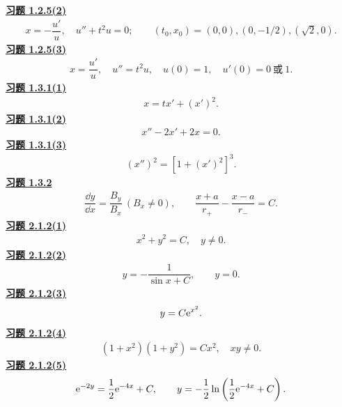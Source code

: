 \noindent\textbf{\hyperref[q:1.2.5(2)]{习题 1.2.5(2)}}
\[\begin{gathered}x=-\dfrac{u'}u,\quad u''+t^2u=0;\qquad
(t_0,x_0)=(0,0),(0,-1/2),(\sqrt2,0).\end{gathered}\]
\noindent\textbf{\hyperref[q:1.2.5(3)]{习题 1.2.5(3)}}
\[\begin{gathered}x=\dfrac{u'}u,\quad u''=t^2u,\quad u(0)=1,\quad
u'(0)=0\ \text{或}\ 1.\end{gathered}\]
\noindent\textbf{\hyperref[q:1.3.1(1)]{习题 1.3.1(1)}}
\[\begin{gathered}x=tx'+(x')^2.\end{gathered}\]
\noindent\textbf{\hyperref[q:1.3.1(2)]{习题 1.3.1(2)}}
\[\begin{gathered}x''-2x'+2x=0.\end{gathered}\]
\noindent\textbf{\hyperref[q:1.3.1(3)]{习题 1.3.1(3)}}
\[\begin{gathered}(x'')^2=[1+(x')^2]^3.\end{gathered}\]
\noindent\textbf{\hyperref[q:1.3.2]{习题 1.3.2}}
\[\begin{gathered}\dfrac{\dd y}{\dd x}=\dfrac{B_y}{B_x}\ (B_x\ne0),\qquad
\dfrac{x+a}{r_+}-\dfrac{x-a}{r_-}=C.\end{gathered}\]
\noindent\textbf{\hyperref[q:2.1.2(1)]{习题 2.1.2(1)}}
\[\begin{gathered}x^2+y^2=C,\quad y\ne0.\end{gathered}\]
\noindent\textbf{\hyperref[q:2.1.2(2)]{习题 2.1.2(2)}}
\[\begin{gathered}y=-\dfrac1{\sin x+C},\qquad y=0.\end{gathered}\]
\noindent\textbf{\hyperref[q:2.1.2(3)]{习题 2.1.2(3)}}
\[\begin{gathered}y=C\mathrm e^{x^2}.\end{gathered}\]
\noindent\textbf{\hyperref[q:2.1.2(4)]{习题 2.1.2(4)}}
\[\begin{gathered}(1+x^2)(1+y^2)=Cx^2,\quad x y\ne0.\end{gathered}\]
\noindent\textbf{\hyperref[q:2.1.2(5)]{习题 2.1.2(5)}}
\[\begin{gathered}\mathrm e^{-2y}=\dfrac12\mathrm e^{-4x}+C,\qquad
 y=-\dfrac12\ln\left(\dfrac12\mathrm e^{-4x}+C\right).\end{gathered}\]
